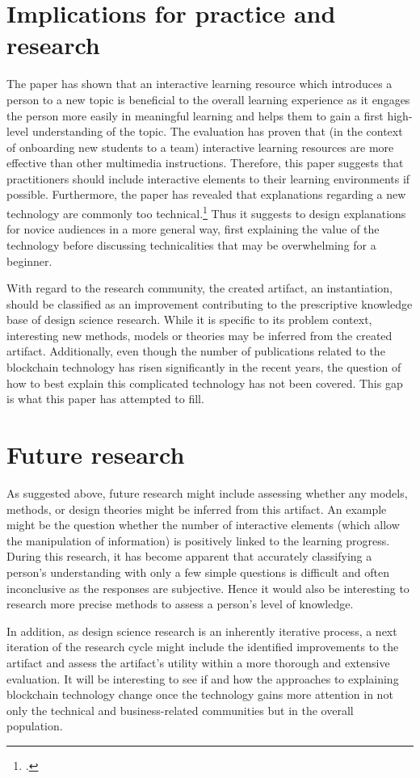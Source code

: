 \section{Implications for practice and research} \label{Implications}
The paper has shown that an interactive learning resource which introduces a person to a new topic is beneficial to the overall learning experience as it engages the person more easily in meaningful learning and helps them to gain a first high-level understanding of the topic. The evaluation has proven that (in the context of onboarding new students to a team) interactive learning resources are more effective than other multimedia instructions. Therefore, this paper suggests that practitioners should include interactive elements to their learning environments if possible. Furthermore, the paper has revealed that explanations regarding a new technology are commonly too technical.\footcite[Cf.][]{DanielKaltenbach_Interview} Thus it suggests to design explanations for novice audiences in a more general way, first explaining the value of the technology before discussing technicalities that may be overwhelming for a beginner.

With regard to the research community, the created artifact, an instantiation, should be classified as an improvement contributing to the prescriptive knowledge base of design science research. While it is specific to its problem context, interesting new methods, models or theories may be inferred from the created artifact. Additionally, even though the number of publications related to the blockchain technology has risen significantly in the recent years, the question of how to best explain this complicated technology has not been covered. This gap is what this paper has attempted to fill.

\section{Future research} \label{sec:FutureResearch}
As suggested above, future research might include assessing whether any models, methods, or design theories might be inferred from this artifact. An example might be the question whether the number of interactive elements (which allow the manipulation of information) is positively linked to the learning progress. During this research, it has become apparent that accurately classifying a person's understanding with only a few simple questions is difficult and often inconclusive as the responses are subjective. Hence it would also be interesting to research more precise methods to assess a person's level of knowledge.

In addition, as design science research is an inherently iterative process, a next iteration of the research cycle might include the identified improvements to the artifact and assess the artifact's utility within a more thorough and extensive evaluation. It will be interesting to see if and how the approaches to explaining blockchain technology change once the technology gains more attention in not only the technical and business-related communities but in the overall population.